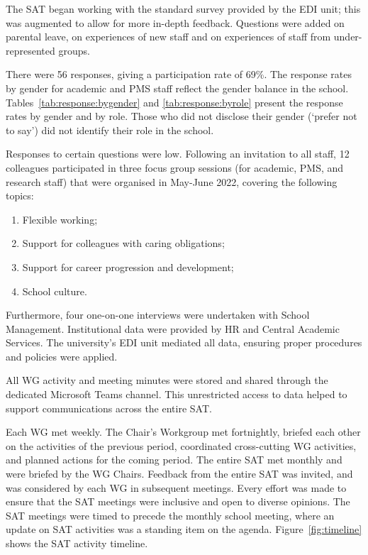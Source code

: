 The SAT began working with the standard survey provided by the EDI unit; this was augmented to allow for more in-depth feedback.
Questions were added on parental leave, on experiences of new staff and on experiences of staff from under-represented groups. 









There were 56 responses, giving a participation rate of 69\%.  The response rates by gender for academic and \ac{PMS} staff reflect the gender balance in the school. Tables~\ref{tab:response:bygender} and \ref{tab:response:byrole} present the response rates by gender and by role. Those who did not disclose their gender (`prefer not to say') did not identify their role in the school. 

Responses to certain questions were low.
Following an invitation to all staff, 12 colleagues participated in 
three focus group sessions (for academic, PMS, and research staff) that were organised in May-June 2022, covering the following topics:

\begin{enumerate}[noitemsep]
\item Flexible working;
\item Support for colleagues with caring obligations; 
\item Support for career progression and development; 
\item School culture.
\end{enumerate}



Furthermore, four one-on-one interviews were undertaken with School Management.
Institutional data were provided by \ac{HR} and Central Academic Services. The university's EDI unit mediated all data, ensuring proper procedures and policies were applied.  



All WG activity and meeting minutes were stored and shared through the dedicated Microsoft Teams channel. This unrestricted access to data helped to support communications across the entire SAT. 


Each WG met weekly. The Chair's Workgroup met fortnightly, briefed each other on the activities of the previous period, coordinated cross-cutting WG activities, and planned actions for the coming period. 
The entire SAT met monthly and were briefed by the WG Chairs. Feedback from the entire SAT was invited, and was considered by each WG in subsequent meetings. Every effort was made to ensure that the SAT meetings were inclusive and open to diverse opinions.
The SAT meetings were timed to precede the monthly school meeting, where an update on SAT activities was a standing item on the agenda.
Figure~\ref{fig:timeline} shows the SAT activity timeline.

